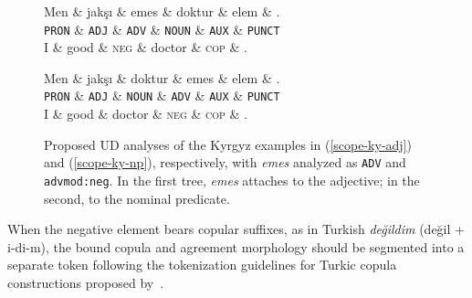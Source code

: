 \documentclass[10pt, a4paper]{article}
\newcommand{\gl}[1]{\textsc{#1}}
\newcommand{\upos}[1]{\texttt{#1}}
\newcommand{\rel}[1]{\texttt{#1}}
\begin{document}
\begin{figure}[ht]
  \centering
  \begin{dependency}
    \begin{deptext}[column sep=0.2em]
      Men \& jakşı \& emes \& doktur  \& elem \& . \\
      \footnotesize \upos{PRON} \& \footnotesize \upos{ADJ} \& \footnotesize \upos{ADV} \& \footnotesize \upos{NOUN} \& \footnotesize \upos{AUX} \& \upos{PUNCT} \\
      \footnotesize I \& \footnotesize good \& \footnotesize \gl{neg} \& \footnotesize doctor \& \footnotesize \gl{cop} \& . \\
    \end{deptext}


  \end{dependency}
  \vspace{1em}
  \begin{dependency}
    \begin{deptext}[column sep=0.2em]
      Men \& jakşı \& doktur \& emes  \& elem \& . \\
      \footnotesize \upos{PRON} \& \footnotesize \upos{ADJ} \& \footnotesize \upos{NOUN} \& \footnotesize \upos{ADV} \& \footnotesize \upos{AUX} \& \upos{PUNCT} \\
      \footnotesize I \& \footnotesize good \& \footnotesize doctor \& \footnotesize \gl{neg} \& \footnotesize \gl{cop} \& . \\
    \end{deptext}


  \end{dependency}
  \caption{Proposed UD analyses of the Kyrgyz examples in (\ref{scope-ky-adj}) and (\ref{scope-ky-np}), respectively, with \emph{emes} analyzed as \upos{ADV} and \rel{advmod:neg}.
  In the first tree, \emph{emes} attaches to the adjective; in the second, to the nominal predicate.}
  \label{fig:kyr-tree}
\end{figure}

When the negative element bears copular suffixes, as in Turkish \emph{değildim} (değil + i-di-m), the bound copula and agreement morphology should be segmented into a separate token following the tokenization guidelines for Turkic copula constructions proposed by~\citet{coltekinTokenisationTurkicCopula2026}.
\end{document}
